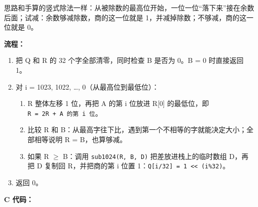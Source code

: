 \documentclass[11pt,a4paper]{ctexart}
\providecommand{\tightlist}{\setlength{\itemsep}{0pt}\setlength{\parskip}{0pt}}
\begin{document}
思路和手算的竖式除法一样：从被除数的最高位开始，一位一位``落下来''接在余数后面；试减：余数够减除数，商的这一位就是
1，并减掉除数；不够减，商的这一位就是 0。


\textbf{流程：}

\begin{enumerate}
\def\labelenumi{\arabic{enumi}.}
\tightlist
\item
  把 Q 和 R 的 32 个字全部清零，同时检查 B 是否为 0。B = 0 时直接返回
  1。
\item
  对 i = 1023, 1022, \ldots, 0（从最高位到最低位）：

  \begin{enumerate}
  \def\labelenumii{\arabic{enumii}.}
  \tightlist
  \item
    R 整体左移 1 位，再把 A 的第 i 位放进 R{[}0{]} 的最低位，即
    \texttt{R\ =\ 2R\ +\ A\ 的第\ i\ 位}。
  \item
    比较 R 和
    B：从最高字往下比，遇到第一个不相等的字就能决定大小；全部相等说明 R
    = B，也算够减。
  \item
    如果 R \ensuremath{\geq} B：调用 \texttt{sub1024(R,\ B,\ D)}
    把差放进栈上的临时数组 D，再把 D 复制回 R，并把商的第 i 位置
    1：\texttt{Q{[}i/32{]}\ \textbar{}=\ 1\ \textless{}\textless{}\ (i\%32)}。
  \end{enumerate}
\item
  返回 0。
\end{enumerate}


\textbf{C 代码：}
\end{document}
